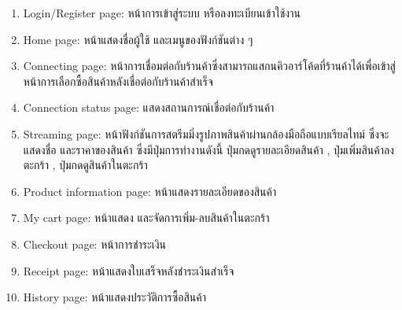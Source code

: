     \begin{enumerate}
        \item Login/Register page: หน้าการเข้าสู่ระบบ หรือลงทะเบียนเข้าใช้งาน
        \item Home page: หน้าแสดงชื่อผู้ใช้ และเมนูของฟังก์ชันต่าง ๆ
        \item Connecting page: หน้าการเชื่อมต่อกับร้านค้าซึ่งสามารถแสกนคิวอาร์โค้ดที่ร้านค้าได้เพื่อเข้าสู่หน้าการเลือกซื้อสินค้าหลังเชื่อต่อกับร้านค้าสำเร็จ
        \item Connection status page: แสดงสถานการณ์เชื่อต่อกับร้านค้า
        \item Streaming page: หน้าฟังก์ชันการสตรีมมิ่งรูปภาพสินค้าผ่านกล้องมือถือแบบเรียลไทม์ ซึ่งจะแสดงชื่อ และราคาของสินค้า ซึ่งมีปุ่มการทำงานดังนี้ ปุ่มกดดูรายละเอียดสินค้า ,  ปุ่มเพิ่มสินค้าลงตะกร้า , ปุ่มกดดูสินค้าในตะกร้า
        \item Product information page: หน้าแสดงรายละเอียดของสินค้า
        \item My cart page: หน้าแสดง และจัดการเพิ่ม-ลบสินค้าในตะกร้า
        \item Checkout page: หน้าการชำระเงิน
        \item Receipt page: หน้าแสดงใบเสร็จหลังชำระเงินสำเร็จ
        \item History page: หน้าแสดงประวัติการซื้อสินค้า
    \end{enumerate}
    



